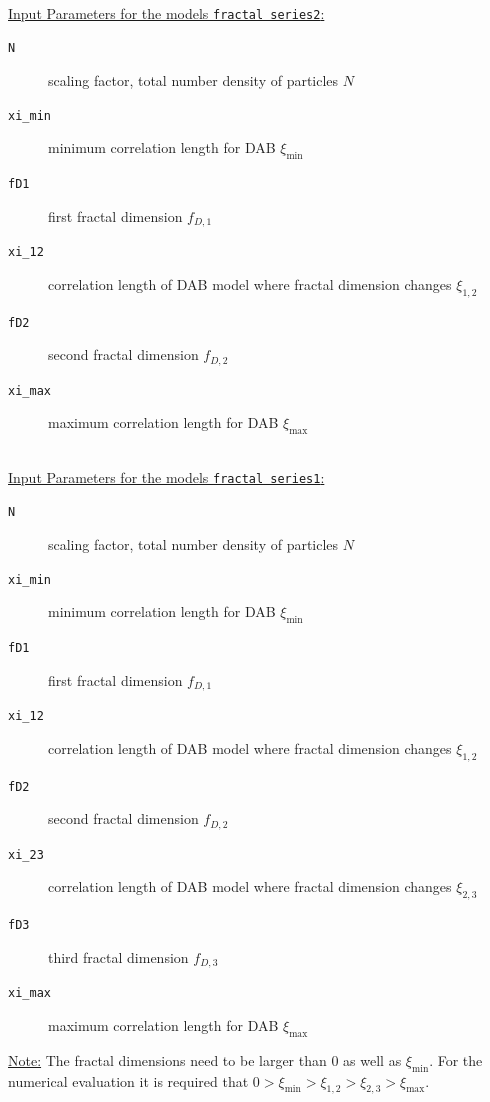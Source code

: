 \hspace{1pt}\\
\underline{Input Parameters for the models \texttt{fractal series2}:}\\
\begin{description}
\item[\texttt{N}] scaling factor, total number density of particles $N$
\item[\texttt{xi\_min}] minimum correlation length for DAB $\xi_\mathrm{min}$
\item[\texttt{fD1}] first fractal dimension $f_{D,1}$
\item[\texttt{xi\_12}] correlation length of DAB model where fractal dimension changes $\xi_{1,2}$
\item[\texttt{fD2}] second fractal dimension $f_{D,2}$
\item[\texttt{xi\_max}] maximum correlation length for DAB $\xi_\mathrm{max}$
\end{description}

\hspace{1pt}\\
\underline{Input Parameters for the models \texttt{fractal series1}:}\\
\begin{description}
\item[\texttt{N}] scaling factor, total number density of particles $N$
\item[\texttt{xi\_min}] minimum correlation length for DAB $\xi_\mathrm{min}$
\item[\texttt{fD1}] first fractal dimension $f_{D,1}$
\item[\texttt{xi\_12}] correlation length of DAB model where fractal dimension changes $\xi_{1,2}$
\item[\texttt{fD2}] second fractal dimension $f_{D,2}$
\item[\texttt{xi\_23}] correlation length of DAB model where fractal dimension changes $\xi_{2,3}$
\item[\texttt{fD3}] third fractal dimension $f_{D,3}$
\item[\texttt{xi\_max}] maximum correlation length for DAB $\xi_\mathrm{max}$
\end{description}
\noindent\underline{Note:}
The fractal dimensions need to be larger than 0 as well as $\xi_\mathrm{min}$. For the numerical evaluation it is required that $0>\xi_\mathrm{min}>\xi_{1,2}>\xi_{2,3}>\xi_\mathrm{max}$.

